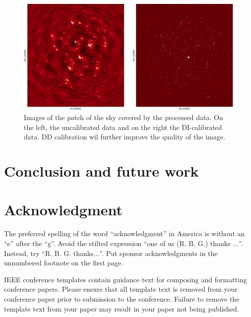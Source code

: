 \documentclass[conference]{IEEEtran}
\begin{document}
\begin{figure}[htbp]
    \centerline{\includegraphics[width=.5\textwidth]{results}}
    \caption{Images of the patch of the sky covered by the processed data. On the left, the uncalibrated data and on the right the DI-calibrated data. DD calibration wil further improve the quality of the image.}
    \label{res}
\end{figure}

\section{Conclusion and future work}

\section*{Acknowledgment}

The preferred spelling of the word ``acknowledgment'' in America is without 
an ``e'' after the ``g''. Avoid the stilted expression ``one of us (R. B. 
G.) thanks $\ldots$''. Instead, try ``R. B. G. thanks$\ldots$''. Put sponsor 
acknowledgments in the unnumbered footnote on the first page.





\vspace{12pt}
\color{red}
IEEE conference templates contain guidance text for composing and formatting conference papers. Please ensure that all template text is removed from your conference paper prior to submission to the conference. Failure to remove the template text from your paper may result in your paper not being published.
\end{document}
